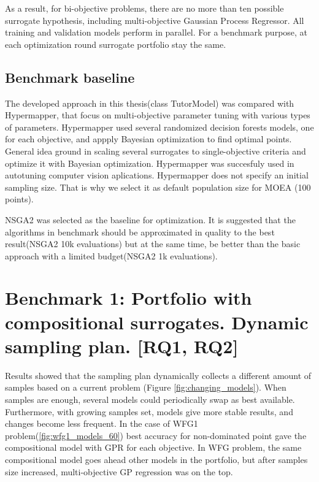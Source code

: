         As a result, for bi-objective problems, there are no more than ten possible surrogate hypothesis, including multi-objective Gaussian Process Regressor. All training and validation models perform in parallel. For a benchmark purpose, at each optimization round surrogate portfolio stay the same. 

    \subsection{Benchmark baseline}
    The developed approach in this thesis(class TutorModel) was compared with Hypermapper\cite{nardi2019practical}, that focus on multi-objective parameter tuning with various types of parameters. Hypermapper used several randomized decision forests models, one for each objective, and appply Bayesian optimization to find optimal points. General idea ground in scaling several surrogates to single-objective criteria and optimize it with Bayesian optimization. Hypermapper was succesfuly used in autotuning computer vision aplications. Hypermapper does not specify an initial sampling size. That is why we select it as default population size for MOEA (100 points).

    NSGA2 was selected as the baseline for optimization. It is suggested that the algorithms in benchmark should be approximated in quality to the best result(NSGA2 10k evaluations) but at the same time, be better than the basic approach with a limited budget(NSGA2 1k evaluations).

\section{Benchmark 1: Portfolio with compositional surrogates. Dynamic sampling plan. [RQ1, RQ2]}
    Results showed that the sampling plan dynamically collects a different amount of samples based on a current problem (Figure \ref{fig:changing_models}). When samples are enough, several models could periodically swap as best available. Furthermore, with growing samples set, models give more stable results, and changes become less frequent. In the case of WFG1 problem(\ref{fig:wfg1_models_60}) best accuracy for non-dominated point gave the compositional model with GPR for each objective. In WFG problem, the same compositional model goes ahead other models in the portfolio, but after samples size increased, multi-objective GP regression was on the top.

